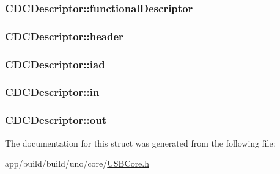 \hypertarget{struct_c_d_c_descriptor_a7ecaf88d51cad3091ba16c3efabd27ad}{
\subsubsection[{functional\-Descriptor}]{ C\-D\-C\-Descriptor\-::functional\-Descriptor}}\label{struct_c_d_c_descriptor_a7ecaf88d51cad3091ba16c3efabd27ad}
\hypertarget{struct_c_d_c_descriptor_a3f84b78e1d78e821a539564e57375cf5}{
\subsubsection[{header}]{ C\-D\-C\-Descriptor\-::header}}\label{struct_c_d_c_descriptor_a3f84b78e1d78e821a539564e57375cf5}
\hypertarget{struct_c_d_c_descriptor_a42c277dcdc03a000bb15a468104c996a}{
\subsubsection[{iad}]{ C\-D\-C\-Descriptor\-::iad}}\label{struct_c_d_c_descriptor_a42c277dcdc03a000bb15a468104c996a}
\hypertarget{struct_c_d_c_descriptor_af7c4a71ccaa04b9158318b02d64522e6}{
\subsubsection[{in}]{ C\-D\-C\-Descriptor\-::in}}\label{struct_c_d_c_descriptor_af7c4a71ccaa04b9158318b02d64522e6}
\hypertarget{struct_c_d_c_descriptor_a24ee64d6d086973e16e7a8cd232da817}{
\subsubsection[{out}]{ C\-D\-C\-Descriptor\-::out}}\label{struct_c_d_c_descriptor_a24ee64d6d086973e16e7a8cd232da817}


The documentation for this struct was generated from the following file\-:\begin{DoxyCompactItemize}
\item 
app/build/build/uno/core/\hyperlink{_u_s_b_core_8h}{U\-S\-B\-Core.\-h}\end{DoxyCompactItemize}
